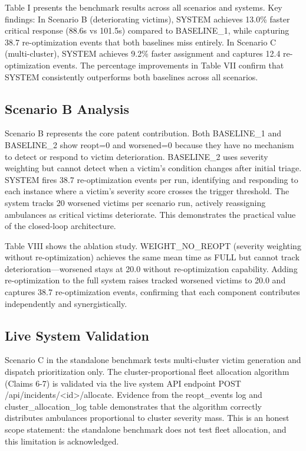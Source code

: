 \documentclass[conference]{IEEEtran}
\begin{document}
Table I presents the benchmark results across all scenarios and systems. Key findings: In Scenario B (deteriorating victims), SYSTEM achieves 13.0\% faster critical response (88.6s vs 101.5s) compared to BASELINE\_1, while capturing 38.7 re-optimization events that both baselines miss entirely. In Scenario C (multi-cluster), SYSTEM achieves 9.2\% faster assignment and captures 12.4 re-optimization events. The percentage improvements in Table VII confirm that SYSTEM consistently outperforms both baselines across all scenarios.

\subsection{Scenario B Analysis}

Scenario B represents the core patent contribution. Both BASELINE\_1 and BASELINE\_2 show reopt=0 and worsened=0 because they have no mechanism to detect or respond to victim deterioration. BASELINE\_2 uses severity weighting but cannot detect when a victim's condition changes after initial triage. SYSTEM fires 38.7 re-optimization events per run, identifying and responding to each instance where a victim's severity score crosses the trigger threshold. The system tracks 20 worsened victims per scenario run, actively reassigning ambulances as critical victims deteriorate. This demonstrates the practical value of the closed-loop architecture.

Table VIII shows the ablation study. WEIGHT\_NO\_REOPT (severity weighting without re-optimization) achieves the same mean time as FULL but cannot track deterioration---worsened stays at 20.0 without re-optimization capability. Adding re-optimization to the full system raises tracked worsened victims to 20.0 and captures 38.7 re-optimization events, confirming that each component contributes independently and synergistically.

\subsection{Live System Validation}

Scenario C in the standalone benchmark tests multi-cluster victim generation and dispatch prioritization only. The cluster-proportional fleet allocation algorithm (Claims 6-7) is validated via the live system API endpoint POST /api/incidents/<id>/allocate. Evidence from the reopt\_events log and cluster\_allocation\_log table demonstrates that the algorithm correctly distributes ambulances proportional to cluster severity mass. This is an honest scope statement: the standalone benchmark does not test fleet allocation, and this limitation is acknowledged.
\end{document}
